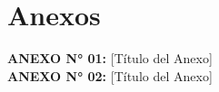 \documentclass[11pt,letterpaper]{report}
\begin{document}
\vspace{2em}

\chapter{Anexos}
\textbf{ANEXO N° 01:} [Título del Anexo] \\
\textbf{ANEXO N° 02:} [Título del Anexo]
\end{document}
